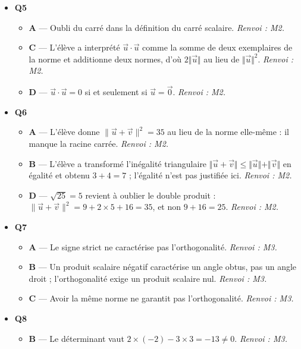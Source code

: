 \begin{itemize}
\begin{itemize}
    \item \textbf{D} — Confusion entre le carré de la norme de la somme et le carré du produit scalaire. \emph{Renvoi : M2.}
  \end{itemize}
  \item \textbf{Q5}
  \begin{itemize}
    \item \textbf{A} — Oubli du carré dans la définition du carré scalaire. \emph{Renvoi : M2.}
    \item \textbf{C} — L'élève a interprété $\vec u\cdot\vec u$ comme la somme de deux exemplaires de la norme et additionne deux normes, d'où $2\Vert\vec u\Vert$ au lieu de $\Vert\vec u\Vert^2$. \emph{Renvoi : M2.}
    \item \textbf{D} — $\vec{u}\cdot\vec{u}=0$ si et seulement si $\vec{u}=\vec{0}$. \emph{Renvoi : M2.}
  \end{itemize}
  \item \textbf{Q6}
  \begin{itemize}
    \item \textbf{A} — L'élève donne $\|\vec{u}+\vec{v}\|^2 = 35$ au lieu de la norme elle-même : il manque la racine carrée. \emph{Renvoi : M2.}
    \item \textbf{B} — L'élève a transformé l'inégalité triangulaire $\Vert\vec u+\vec v\Vert\leqslant\Vert\vec u\Vert+\Vert\vec v\Vert$ en égalité et obtenu $3+4=7$ ; l'égalité n'est pas justifiée ici. \emph{Renvoi : M2.}
    \item \textbf{D} — $\sqrt{25}=5$ revient à oublier le double produit : $\|\vec{u}+\vec{v}\|^2 = 9 + 2\times 5 + 16 = 35$, et non $9+16=25$. \emph{Renvoi : M2.}
  \end{itemize}
  \item \textbf{Q7}
  \begin{itemize}
    \item \textbf{A} — Le signe strict ne caractérise pas l'orthogonalité. \emph{Renvoi : M3.}
    \item \textbf{B} — Un produit scalaire négatif caractérise un angle obtus, pas un angle droit ; l'orthogonalité exige un produit scalaire nul. \emph{Renvoi : M3.}
    \item \textbf{C} — Avoir la même norme ne garantit pas l'orthogonalité. \emph{Renvoi : M3.}
  \end{itemize}
  \item \textbf{Q8}
  \begin{itemize}
    \item \textbf{B} — Le déterminant vaut $2 \times (-2) - 3 \times 3 = -13 \neq 0$. \emph{Renvoi : M3.}

\end{itemize}
\end{itemize}
